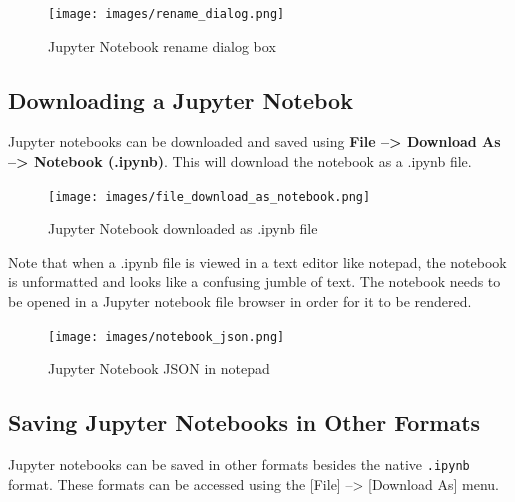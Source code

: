 \documentclass{book}
\begin{document}
\begin{figure}
\centering
\texttt{[image: images/rename\_dialog.png]}
\caption{Jupyter Notebook rename dialog box}
\end{figure}
    




    
        \subsection{Downloading a Jupyter
Notebok}\label{downloading-a-jupyter-notebok}

Jupyter notebooks can be downloaded and saved using \textbf{File
--\textgreater{} Download As --\textgreater{} Notebook (.ipynb)}. This
will download the notebook as a .ipynb file.

\begin{figure}
\centering
\texttt{[image: images/file\_download\_as\_notebook.png]}
\caption{Jupyter Notebook downloaded as .ipynb file}
\end{figure}

Note that when a .ipynb file is viewed in a text editor like notepad,
the notebook is unformatted and looks like a confusing jumble of text.
The notebook needs to be opened in a Jupyter notebook file browser in
order for it to be rendered.

\begin{figure}
\centering
\texttt{[image: images/notebook\_json.png]}
\caption{Jupyter Notebook JSON in notepad}
\end{figure}
    




    
        \subsection{Saving Jupyter Notebooks in Other
Formats}\label{saving-jupyter-notebooks-in-other-formats}

Jupyter notebooks can be saved in other formats besides the native
\lstinline!.ipynb! format. These formats can be accessed using the
{[}File{]} --\textgreater{} {[}Download As{]} menu.
\end{document}
